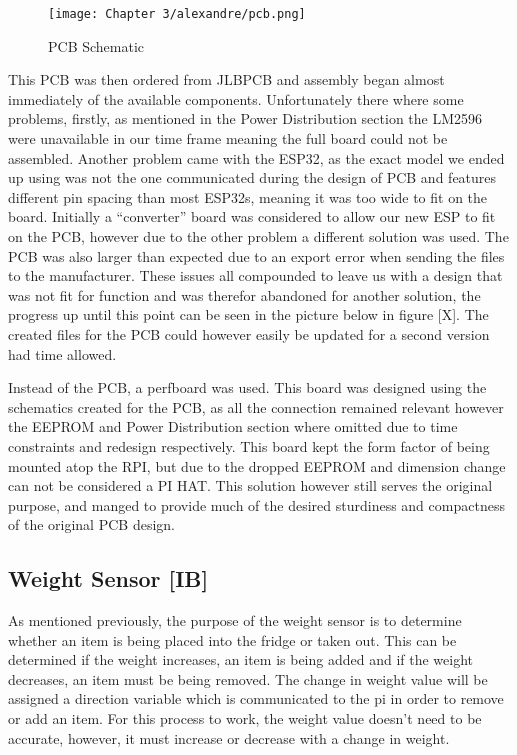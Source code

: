 \begin{figure}[H]        
    \centering
    \texttt{[image: Chapter 3/alexandre/pcb.png]}
    \caption{PCB Schematic}
    \label{fig:pcbs}
\end{figure} 

This PCB was then ordered from JLBPCB and assembly began almost immediately of the available components.
Unfortunately there where some problems, firstly, as mentioned in the Power Distribution section the LM2596 were unavailable in our time frame meaning the full board could not be assembled.
Another problem came with the ESP32, as the exact model we ended up using was not the one communicated during the design of PCB and features different pin spacing than most ESP32s, meaning it was too wide to fit on the board.
Initially a “converter” board was considered to allow our new ESP to fit on the PCB, however due to the other problem a different solution was used.
The PCB was also larger than expected due to an export error when sending the files to the manufacturer.
These issues all compounded to leave us with a design that was not fit for function and was therefor abandoned for another solution, the progress up until this point can be seen in the picture below in figure [X].
The created files for the PCB could however easily be updated for a second version had time allowed.

Instead of the PCB, a perfboard was used.
This board was designed using the schematics created for the PCB, as all the connection remained relevant however the EEPROM and Power Distribution section where omitted due to time constraints and redesign respectively.
This board kept the form factor of being mounted atop the RPI, but due to the dropped EEPROM and dimension change can not be considered a PI HAT.
This solution however still serves the original purpose, and manged to provide much of the desired sturdiness and compactness of the original PCB design.


\subsection{Weight Sensor [IB]}

As mentioned previously, the purpose of the weight sensor is to determine whether an item is being placed into the fridge or taken out.
This can be determined if the weight increases, an item is being added and if the weight decreases, an item must be being removed.
The change in weight value will be assigned a direction variable which is communicated to the pi in order to remove or add an item.
For this process to work, the weight value doesn't need to be accurate, however, it must increase or decrease with a change in weight.

